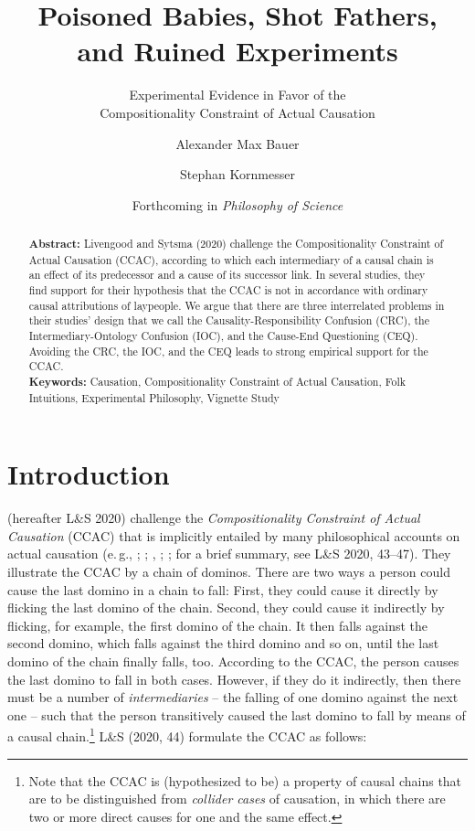 \documentclass[egregdoesnotlikesansseriftitles,12pt]{scrartcl}
\title{Poisoned Babies, Shot Fathers,\\and Ruined Experiments}
\subtitle{Experimental Evidence in Favor of the\\Compositionality Constraint of Actual Causation}
\author[1*]{Alexander Max Bauer}
\author[1]{Stephan Kornmesser}
\affil[1]{ Department of Philosophy, University of Oldenburg}
\affil[*]{ Corresponding Author, E-Mail: \href{mailto:alexander.max.bauer@uni-oldenburg.de}{alexander.max.bauer@uni-oldenburg.de}}
\date{\small Forthcoming in \textit{Philosophy of Science}}
\begin{document}
\maketitle

\begin{abstract}
   \noindent\textbf{Abstract:} Livengood and Sytsma (2020) challenge the Compositionality Constraint of Actual Causation (CCAC), according to which each intermediary of a causal chain is an effect of its predecessor and a cause of its successor link. In several studies, they find support for their hypothesis that the CCAC is not in accordance with ordinary causal attributions of laypeople. We argue that there are three interrelated problems in their studies’ design that we call the Causality-Responsibility Confusion (CRC), the Intermediary-Ontology Confusion (IOC), and the Cause-End Questioning (CEQ). Avoiding the CRC, the IOC, and the CEQ leads to strong empirical support for the CCAC.\\[2ex]
   \textbf{Keywords:} Causation, Compositionality Constraint of Actual Causation, Folk Intuitions, Experimental Philosophy, Vignette Study\\[2ex]
\end{abstract}

\clearpage
\section{Introduction}\label{sec:introduction}
\citet{livengood_actual_2020} (hereafter L\&S 2020) challenge the \textit{Compositionality Constraint of Actual Causation} (CCAC) that is implicitly entailed by many philosophical accounts on actual causation (e.\,g., \cite{reichenbach_direction_1956}; \cite{salmon_causality_1994}; \cite{dowe_causality_1995}, \cite{ehring_causation_1997}; \cite{lewis_causation_1973,lewis_postscripts_1986}; for a brief summary, see L\&S 2020, 43--47). They illustrate the CCAC by a chain of dominos. There are two ways a person could cause the last domino in a chain to fall: First, they could cause it directly by flicking the last domino of the chain. Second, they could cause it indirectly by flicking, for example, the first domino of the chain. It then falls against the second domino, which falls against the third domino and so on, until the last domino of the chain finally falls, too. According to the CCAC, the person causes the last domino to fall in both cases. However, if they do it indirectly, then there must be a number of \textit{intermediaries} -- the falling of one domino against the next one -- such that the person transitively caused the last domino to fall by means of a causal chain.\footnote{Note that the CCAC is (hypothesized to be) a property of causal chains that are to be distinguished from \textit{collider cases} of causation, in which there are two or more direct causes for one and the same effect.} L\&S (2020, 44) formulate the CCAC as follows:
\end{document}
